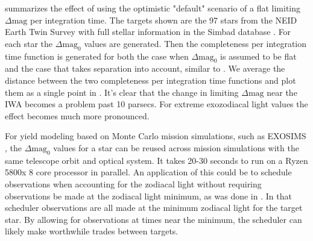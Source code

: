  summarizes the effect of using the optimistic
"default" scenario of a flat limiting $\Delta\textrm{mag}$ per integration time. The targets shown are the 97 stars from the NEID Earth Twin Survey with
full stellar information in the Simbad database
\citep{guptaTargetPrioritization2021}. For each star the $\Delta\textrm{mag}_0$
values are generated. Then the completeness per integration time function is
generated for both the case when $\Delta\textrm{mag}_0$ is assumed to be flat
and the case that takes separation into account, similar to
. We average the distance between the two completeness
per integration time functions and plot them as a single point in
. It's clear that the change in limiting
$\Delta\textrm{mag}$ near the IWA becomes a problem past 10 parsecs. For
extreme exozodiacal light values the effect becomes much more pronounced.

For yield modeling based on Monte Carlo mission simulations, such as EXOSIMS
\citep{savranskyWFIRSTAFTACoronagraphScience2015, delacroixScienceYield2016,
savranskyEXOSIMSExoplanetOpenSource2017}, the $\Delta\textrm{mag}_0$ values for
a star can be reused across mission simulations with the same telescope orbit
and optical system. It takes 20-30 seconds to run on a Ryzen 5800x 8 core
processor in parallel. An application of this could be to schedule observations
when accounting for the zodiacal light without requiring observations be made
at the zodiacal light minimum, as was done in \citet{keithlyOptimalScheduling2020}. In
that scheduler observations are all made at the minimum zodiacal light for the
target star. By allowing for observations at times near the minimum, the
scheduler can likely make worthwhile trades between targets.


